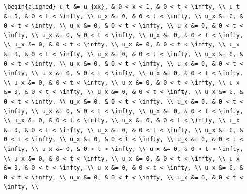\documentclass[
  ukrainian,
]{article}
\begin{document}
\begin{verbatim}
\begin{aligned} u_t &= u_{xx}, & 0 < x < 1, & 0 < t < \infty, \\ u_t &= 0, & 0 < t < \infty, \\ u_x &= 0, & 0 < t < \infty, \\ u_x &= 0, & 0 < t < \infty, \\ u_x &= 0, & 0 < t < \infty, \\ u_x &= 0, & 0 < t < \infty, \\ u_x &= 0, & 0 < t < \infty, \\ u_x &= 0, & 0 < t < \infty, \\ u_x &= 0, & 0 < t < \infty, \\ u_x &= 0, & 0 < t < \infty, \\ u_x &= 0, & 0 < t < \infty, \\ u_x &= 0, & 0 < t < \infty, \\ u_x &= 0, & 0 < t < \infty, \\ u_x &= 0, & 0 < t < \infty, \\ u_x &= 0, & 0 < t < \infty, \\ u_x &= 0, & 0 < t < \infty, \\ u_x &= 0, & 0 < t < \infty, \\ u_x &= 0, & 0 < t < \infty, \\ u_x &= 0, & 0 < t < \infty, \\ u_x &= 0, & 0 < t < \infty, \\ u_x &= 0, & 0 < t < \infty, \\ u_x &= 0, & 0 < t < \infty, \\ u_x &= 0, & 0 < t < \infty, \\ u_x &= 0, & 0 < t < \infty, \\ u_x &= 0, & 0 < t < \infty, \\ u_x &= 0, & 0 < t < \infty, \\ u_x &= 0, & 0 < t < \infty, \\ u_x &= 0, & 0 < t < \infty, \\ u_x &= 0, & 0 < t < \infty, \\ u_x &= 0, & 0 < t < \infty, \\ u_x &= 0, & 0 < t < \infty, \\ u_x &= 0, & 0 < t < \infty, \\ u_x &= 0, & 0 < t < \infty, \\ u_x &= 0, & 0 < t < \infty, \\ u_x &= 0, & 0 < t < \infty, \\ u_x &= 0, & 0 < t < \infty, \\ u_x &= 0, & 0 < t < \infty, \\ u_x &= 0, & 0 < t < \infty, \\ u_x &= 0, & 0 < t < \infty, \\ u_x &= 0, & 0 < t < \infty, \\ u_x &= 0, & 0 < t < \infty, \\ u_x &= 0, & 0 < t < \infty, \\ 
\end{verbatim}
\end{document}
